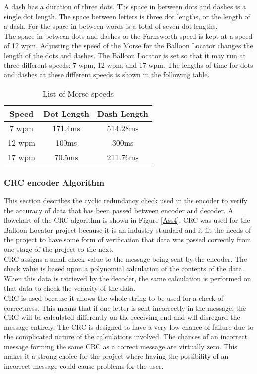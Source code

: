\documentclass[12pt, letterpaper]{article}
\begin{document}
A dash has a duration of three dots. The space in between dots and dashes is a single dot length. The space between letters is three dot lengths, or the length of a dash. For the space in between words is a total of seven dot lengths. \\

The space in between dots and dashes or the Farnsworth speed is kept at a speed of 12 wpm. Adjusting the speed of the Morse for the Balloon Locator changes the length of the dots and dashes. The Balloon Locator is set so that it may run at three different speeds: 7 wpm, 12 wpm, and 17 wpm. The lengths of time for dots and dashes at these different speeds is shown in the following table.

\begin{table}[h]
\centering
\caption{List of Morse speeds}
\begin{tabular}{|c|c|c|}
\hline
 Speed & Dot Length & Dash Length \\
 \hline \hline
 7 wpm & 171.4ms & 514.28ms\\
 \hline
 12 wpm & 100ms & 300ms\\
 \hline
 17 wpm & 70.5ms & 211.76ms \\
 \hline
 
 \end{tabular}
 \end{table}

\subsubsection{CRC encoder Algorithm}
This section describes the cyclic redundancy check used in the encoder to verify the accuracy of data that has been passed between encoder and decoder. A flowchart of the CRC algorithm is shown in Figure \ref{Ass4}. CRC was used for the Balloon Locator project because it is an industry standard and it fit the needs of the project to have some form of verification that data was passed correctly from one stage of the project to the next.\\

CRC assigns a small check value to the message being sent by the encoder. The check value is based upon a polynomial calculation of the contents of the data. When this data is retrieved by the decoder, the same calculation is performed on that data to check the veracity of the data.\\

CRC is used because it allows the whole string to be used for a check of correctness. This means that if one letter is sent incorrectly in the message, the CRC will be calculated differently on the receiving end and will disregard the message entirely. The CRC is designed to have a very low chance of failure due to the complicated nature of the calculations involved. The chances of an incorrect message forming the same CRC as a correct message are virtually zero. This makes it a strong choice for the project where having the possibility of an incorrect message could cause problems for the user. 
\end{document}

